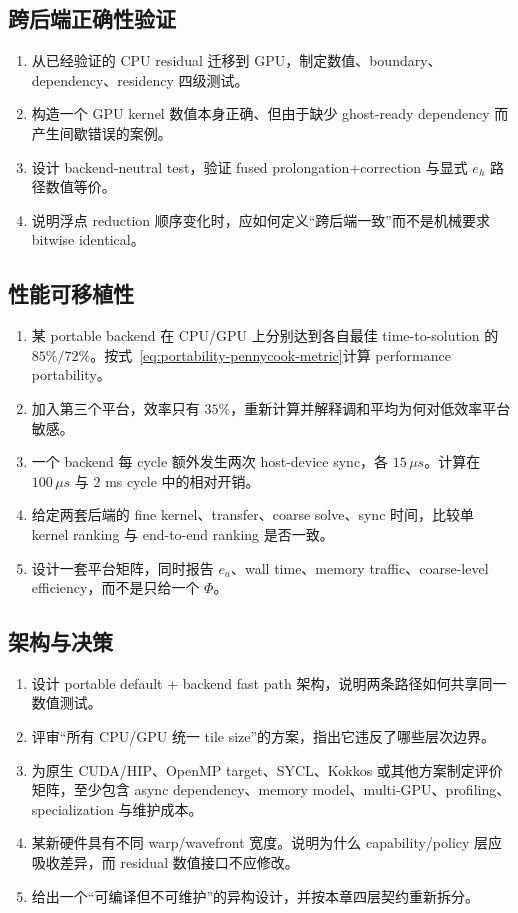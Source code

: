 \subsection*{跨后端正确性验证}
\begin{enumerate}[label=\arabic*.]
\item 从已经验证的 CPU residual 迁移到 GPU，制定数值、boundary、dependency、residency 四级测试。
\item 构造一个 GPU kernel 数值本身正确、但由于缺少 ghost-ready dependency 而产生间歇错误的案例。
\item 设计 backend-neutral test，验证 fused prolongation+correction 与显式 $e_h$ 路径数值等价。
\item 说明浮点 reduction 顺序变化时，应如何定义“跨后端一致”而不是机械要求 bitwise identical。
\end{enumerate}

\subsection*{性能可移植性}
\begin{enumerate}[label=\arabic*.]
\item 某 portable backend 在 CPU/GPU 上分别达到各自最佳 time-to-solution 的 $85\%/72\%$。按式~\eqref{eq:portability-pennycook-metric}计算 performance portability。
\item 加入第三个平台，效率只有 $35\%$，重新计算并解释调和平均为何对低效率平台敏感。
\item 一个 backend 每 cycle 额外发生两次 host-device sync，各 $15\,\mu s$。计算在 $100\,\mu s$ 与 $2$ ms cycle 中的相对开销。
\item 给定两套后端的 fine kernel、transfer、coarse solve、sync 时间，比较单 kernel ranking 与 end-to-end ranking 是否一致。
\item 设计一套平台矩阵，同时报告 $e_a$、wall time、memory traffic、coarse-level efficiency，而不是只给一个 $\Phi$。
\end{enumerate}

\subsection*{架构与决策}
\begin{enumerate}[label=\arabic*.]
\item 设计 portable default + backend fast path 架构，说明两条路径如何共享同一数值测试。
\item 评审“所有 CPU/GPU 统一 tile size”的方案，指出它违反了哪些层次边界。
\item 为原生 CUDA/HIP、OpenMP target、SYCL、Kokkos 或其他方案制定评价矩阵，至少包含 async dependency、memory model、multi-GPU、profiling、specialization 与维护成本。
\item 某新硬件具有不同 warp/wavefront 宽度。说明为什么 capability/policy 层应吸收差异，而 residual 数值接口不应修改。
\item 给出一个“可编译但不可维护”的异构设计，并按本章四层契约重新拆分。
\end{enumerate}
